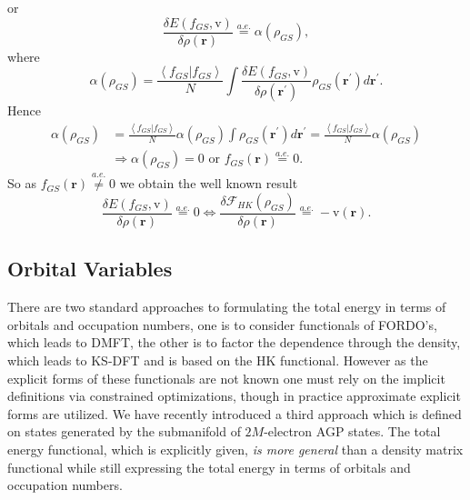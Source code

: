 \documentclass[aps,preprint]{revtex4}%
\begin{document}
or
\begin{equation}
\frac{\delta E\left(  f_{GS}\boldsymbol{,}\mathrm{v}\right)  }{\delta
\rho\left(  \boldsymbol{r}\right)  }\overset{a.e.}{=}\alpha\left(  \rho
_{GS}\right)  , \label{fmin}%
\end{equation}
where%
\begin{equation}
\alpha\left(  \rho_{GS}\right)  =\frac{\left\langle f_{GS}|f_{GS}\right\rangle
}{N}\int\frac{\delta E\left(  f_{GS}\boldsymbol{,}\mathrm{v}\right)  }%
{\delta\rho\left(  \boldsymbol{r}^{\prime}\right)  }\rho_{GS}\left(
\boldsymbol{r}^{\prime}\right)  d\boldsymbol{r}^{\prime}. \label{alpha}%
\end{equation}
Hence
\begin{align}
\alpha\left(  \rho_{GS}\right)   &  =\frac{\left\langle f_{GS}|f_{GS}%
\right\rangle }{N}\alpha\left(  \rho_{GS}\right)  \int\rho_{GS}\left(
\boldsymbol{r}^{\prime}\right)  d\boldsymbol{r}^{\prime}=\frac{\left\langle
f_{GS}|f_{GS}\right\rangle }{N}\alpha\left(  \rho_{GS}\right) \\
&  \Rightarrow\alpha\left(  \rho_{GS}\right)  =0\text{ or }f_{GS}\left(
\boldsymbol{r}\right)  \overset{a.e.}{=}0.
\end{align}
So as $f_{GS}\left(  \boldsymbol{r}\right)  \overset{a.e.}{\neq}0$ we obtain
the well known result
\begin{equation}
\frac{\delta E\left(  f_{GS}\boldsymbol{,}\mathrm{v}\right)  }{\delta
\rho\left(  \boldsymbol{r}\right)  }\overset{a.e.}{=}0\Leftrightarrow
\frac{\delta\mathcal{F}_{HK}\left(  \rho_{GS}\right)  }{\delta\rho\left(
\boldsymbol{r}\right)  }\overset{a.e.}{=}-\mathrm{v}\left(  \boldsymbol{r}%
\right)  .
\end{equation}


\subsection{Orbital Variables \label{GSO}}

There are two standard approaches to formulating the total energy in terms of
orbitals and occupation numbers, one is to consider functionals of FORDO's,
which leads to DMFT, the other is to factor the dependence through the
density, which leads to KS-DFT and is based on the HK functional. However as
the explicit forms of these functionals are not known one must rely on the
implicit definitions via constrained optimizations, though in practice
approximate explicit forms are utilized. We have recently
\cite{OrtizWeiner2006} introduced a third approach which is defined on states
generated by the submanifold of $2M$-electron AGP states. The total energy
functional, which is explicitly given, \emph{is more general }than a density
matrix functional while still expressing the total energy in terms of orbitals
and occupation numbers.
\end{document}
